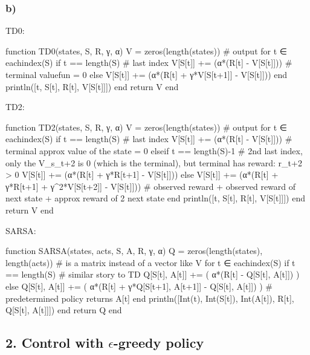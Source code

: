\documentclass[12pt]{article}
\begin{document}
\subsubsection*{b)}
TD0:
\begin{jllisting}
    function TD0(states, S, R, γ, α)
        V = zeros(length(states)) # output
        for t ∈ eachindex(S)
            if t == length(S) # last index
                V[S[t]] += (α*(R[t] - V[S[t]]))  # terminal valuefun = 0
            else
                V[S[t]] += (α*(R[t] + γ*V[S[t+1]] - V[S[t]]))
            end
            println([t, S[t], R[t], V[S[t]]])
        end
        return V
    end
\end{jllisting}
TD2:
\begin{jllisting}
    function TD2(states, S, R, γ, α)
        V = zeros(length(states)) # output
        for t ∈ eachindex(S)
            if t == length(S) # last index
                V[S[t]] += (α*(R[t] - V[S[t]]))  # terminal approx value of the state = 0
            elseif t == length(S)-1 # 2nd last index, only the V_s_t+2 is 0 (which is the terminal), but terminal has reward: r_t+2 > 0
                V[S[t]] += (α*(R[t] + γ*R[t+1] - V[S[t]]))
            else
                V[S[t]] += (α*(R[t] + γ*R[t+1] + γ^2*V[S[t+2]] - V[S[t]])) # observed reward + observed reward of next state + approx reward of 2 next state 
            end
            println([t, S[t], R[t], V[S[t]]])
        end
        return V
    end
\end{jllisting}

SARSA:
\begin{jllisting}
    function SARSA(states, acts, S, A, R, γ, α)
        Q = zeros(length(states), length(acts)) # is a matrix instead of a vector like V
        for t ∈ eachindex(S)
            if t == length(S) # similar story to TD
                Q[S[t], A[t]] += ( α*(R[t] - Q[S[t], A[t]]) )
            else
                Q[S[t], A[t]] += ( α*(R[t] + γ*Q[S[t+1], A[t+1]] - Q[S[t], A[t]]) ) # predetermined policy returns A[t]
            end
            println([Int(t), Int(S[t]), Int(A[t]), R[t], Q[S[t], A[t]]])
        end
        return Q
    end
\end{jllisting}

\subsection*{2. Control with $\epsilon$-greedy policy}
\end{document}
